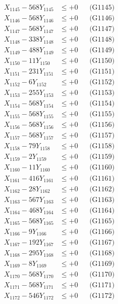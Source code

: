 \documentclass[a4paper,10pt]{article}
\begin{document}
{\begin{align}
X_{1145} - 568Y_{1145} &\leq +0 && \text{(G1145)} \\
X_{1146} - 568Y_{1146} &\leq +0 && \text{(G1146)} \\
X_{1147} - 568Y_{1147} &\leq +0 && \text{(G1147)} \\
X_{1148} - 338Y_{1148} &\leq +0 && \text{(G1148)} \\
X_{1149} - 488Y_{1149} &\leq +0 && \text{(G1149)} \\
X_{1150} - 11Y_{1150} &\leq +0 && \text{(G1150)} \\
\allowbreak
X_{1151} - 231Y_{1151} &\leq +0 && \text{(G1151)} \\
X_{1152} - 6Y_{1152} &\leq +0 && \text{(G1152)} \\
X_{1153} - 255Y_{1153} &\leq +0 && \text{(G1153)} \\
X_{1154} - 568Y_{1154} &\leq +0 && \text{(G1154)} \\
X_{1155} - 568Y_{1155} &\leq +0 && \text{(G1155)} \\
X_{1156} - 568Y_{1156} &\leq +0 && \text{(G1156)} \\
X_{1157} - 568Y_{1157} &\leq +0 && \text{(G1157)} \\
X_{1158} - 79Y_{1158} &\leq +0 && \text{(G1158)} \\
X_{1159} - 2Y_{1159} &\leq +0 && \text{(G1159)} \\
X_{1160} - 11Y_{1160} &\leq +0 && \text{(G1160)} \\
\allowbreak
X_{1161} - 416Y_{1161} &\leq +0 && \text{(G1161)} \\
X_{1162} - 28Y_{1162} &\leq +0 && \text{(G1162)} \\
X_{1163} - 567Y_{1163} &\leq +0 && \text{(G1163)} \\
X_{1164} - 468Y_{1164} &\leq +0 && \text{(G1164)} \\
X_{1165} - 568Y_{1165} &\leq +0 && \text{(G1165)} \\
X_{1166} - 9Y_{1166} &\leq +0 && \text{(G1166)} \\
X_{1167} - 192Y_{1167} &\leq +0 && \text{(G1167)} \\
X_{1168} - 295Y_{1168} &\leq +0 && \text{(G1168)} \\
X_{1169} - 8Y_{1169} &\leq +0 && \text{(G1169)} \\
X_{1170} - 568Y_{1170} &\leq +0 && \text{(G1170)} \\
\allowbreak
X_{1171} - 568Y_{1171} &\leq +0 && \text{(G1171)} \\
X_{1172} - 546Y_{1172} &\leq +0 && \text{(G1172)} \\

\end{align}}
\end{document}
